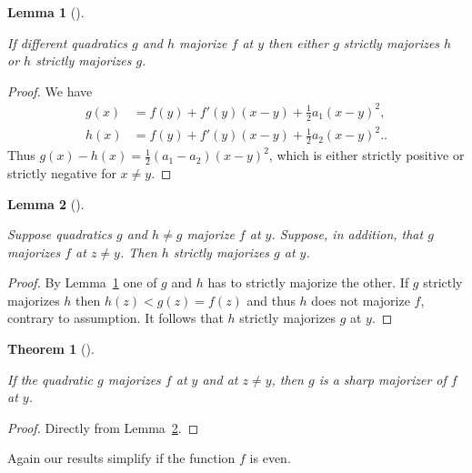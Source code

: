 \documentclass[
  12pt,
  letterpaper,
  DIV=11,
  numbers=noendperiod]{scrartcl}
\theoremstyle{definition}
\theoremstyle{plain}
\newtheorem{lemma}{Lemma}[section]
\theoremstyle{plain}
\newtheorem{theorem}{Theorem}[section]
\theoremstyle{plain}
\theoremstyle{definition}
\theoremstyle{remark}
\begin{document}
\begin{lemma}[]\protect\hypertarget{lem-fan}{}\label{lem-fan}

If different quadratics \(g\) and \(h\) majorize \(f\) at \(y\) then
either \(g\) strictly majorizes \(h\) or \(h\) strictly majorizes \(g\).

\end{lemma}

\begin{proof}
We have \begin{subequations}
\begin{align}
g(x)&=f(y)+f'(y)(x-y)+\frac12a_1(x-y)^2,\label{eq-gfunc}\\
h(x)&=f(y)+f'(y)(x-y)+\frac12a_2(x-y)^2.\label{eq-hfunc}.
\end{align}
\end{subequations} Thus \(g(x)-h(x)=\frac12(a_1-a_2)(x-y)^2\), which is
either strictly positive or strictly negative for \(x\not= y\).
\end{proof}

\begin{lemma}[]\protect\hypertarget{lem-ruit}{}\label{lem-ruit}

Suppose quadratics \(g\) and \(h\not= g\) majorize \(f\) at \(y\).
Suppose, in addition, that \(g\) majorizes \(f\) at \(z\not=y\). Then
\(h\) strictly majorizes \(g\) at \(y\).

\end{lemma}

\begin{proof}
By Lemma~\ref{lem-fan} one of \(g\) and \(h\) has to strictly majorize
the other. If \(g\) strictly majorizes \(h\) then \(h(z)<g(z)=f(z)\) and
thus \(h\) does not majorize \(f\), contrary to assumption. It follows
that \(h\) strictly majorizes \(g\) at \(y\).
\end{proof}

\begin{theorem}[]\protect\hypertarget{thm-ruit}{}\label{thm-ruit}

If the quadratic \(g\) majorizes \(f\) at \(y\) and at \(z\not= y\),
then \(g\) is a sharp majorizer of \(f\) at \(y\).

\end{theorem}

\begin{proof}
Directly from Lemma~\ref{lem-ruit}.
\end{proof}

Again our results simplify if the function \(f\) is even.
\end{document}
